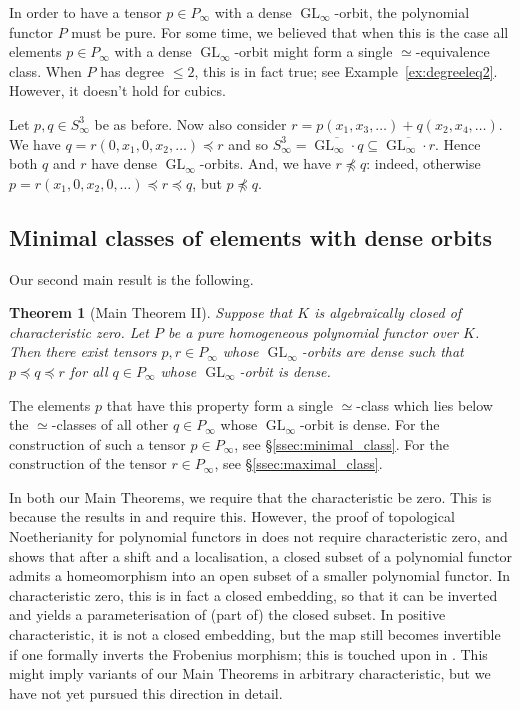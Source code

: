 \documentclass{amsart}
\theoremstyle{plain}
\newtheorem{thm}{Theorem}[subsection]
\theoremstyle{definition}
\DeclareMathOperator{\GL}{GL}
\begin{document}
In order to have a tensor $p\in P_{\infty}$ with a dense $\GL_{\infty}$-orbit, the polynomial functor $P$ must be pure. For some time, we believed that when this is the case all elements $p \in P_\infty$ with a dense $\GL_\infty$-orbit might form a single $\simeq$-equivalence class. When $P$ has degree $\leq2$, this is in fact true; see Example~\ref{ex:degreeleq2}. However, it doesn't hold for cubics.

\begin{ex}\label{ex:noncomparable}
Let $p,q\in S^3_{\infty}$ be as before. Now also consider $r = p(x_1,x_3,\ldots)+q(x_2,x_4,\ldots)$. We have $q=r(0,x_1,0,x_2,\ldots)\preceq r$ and so $S^3_{\infty}=\overline{\GL_{\infty}\!\cdot q}\subseteq\overline{\GL_{\infty}\!\cdot r}$. Hence both $q$ and $r$ have dense $\GL_{\infty}$-orbits. And, we have $r\not\preceq q$: indeed, otherwise $p=r(x_1,0,x_2,0,\ldots)\preceq r\preceq q$, but $p\not\preceq q$.
\end{ex}

\subsection{Minimal classes of elements with dense orbits}

Our second main result is the following.

\begin{thm}[Main Theorem II] \label{thm:MainII}
Suppose that $K$ is algebraically closed of characteristic zero. Let
$P$ be a pure homogeneous polynomial functor over $K$. Then
there exist tensors $p,r \in P_\infty$ whose
$\GL_\infty$-orbits are dense such that $p\preceq q\preceq r$ for all $q\in P_{\infty}$ whose $\GL_\infty$-orbit is dense.
\end{thm}

The elements $p$ that have this property form a single $\simeq$-class
which lies below the $\simeq$-classes of all other $q\in P_{\infty}$
whose $\GL_\infty$-orbit is dense.  For the construction of such a tensor
$p\in P_{\infty}$, see \S\ref{ssec:minimal_class}. For the construction
of the tensor $r \in P_\infty$, see \S\ref{ssec:maximal_class}.

\begin{re} \label{re:Char}
In both our Main Theorems, we require that the characteristic
be zero. This is because the results in \cite{B:thesis} and
\cite{BDES:geometrypolyrep} require this. However, the proof of
topological Noetherianity for polynomial functors in \cite{D:topnoeth}
does not require characteristic zero, and shows that after a shift
and a localisation, a closed subset of a polynomial functor admits a
homeomorphism into an open subset of a smaller polynomial functor. In
characteristic zero, this is in fact a closed embedding, so that it
can be inverted and yields a parameterisation of (part of) the closed
subset. In positive characteristic, it is not a closed embedding, but
the map still becomes invertible if one formally inverts the Frobenius
morphism; this is touched upon in \cite{BDES:geometrypolyrep}. This
might imply variants of our Main Theorems in arbitrary characteristic,
but we have not yet pursued this direction in detail.
\end{re}
\end{document}
